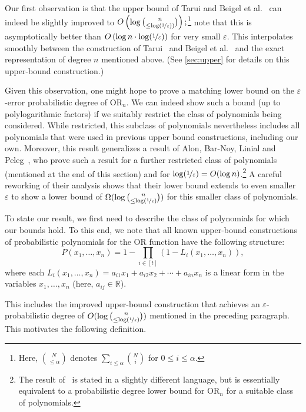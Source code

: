 \documentclass[10pt,a4paper]{article}
\theoremstyle{plain}
\theoremstyle{definition}
\renewcommand{\epsilon}{\varepsilon}
\newcommand{\eps}{\epsilon}
\newcommand{\OR}{\mathrm{OR}}
\newcommand{\reals}{\mathbb{R}}
\newcommand{\cbra}[1]{\left(#1\right)}
\newcommand{\bigo}[1]{O\left(#1\right)}
\newcommand{\lbmain}{\log \binom{n}{\leq \log\cbra{\nicefrac1{\eps}}}}
\newcommand{\lepsinv}{\log(\nicefrac1\eps)}
\begin{document}
Our first observation is that the upper bound of Tarui and Beigel et al.~\cite{BeigelRS1991} can indeed 
be slightly improved to $\bigo{\log \binom{n}{\leq \lepsinv)}};$\footnote{Here, $\binom{N}{\leq \alpha}$
denotes  $\sum_{i \leq \alpha} \binom{N}{i}$ for $0 \leq i \leq \alpha$.} note that this is asymptotically better than  
$\bigo{\log n \cdot \lepsinv}$ for very small $\eps.$ This interpolates smoothly between the construction of 
Tarui~\cite{Tarui1993} and Beigel et al.~\cite{BeigelRS1991} and the exact representation of degree $n$ mentioned above. 
(See \cref{sec:upper} for details on this upper-bound construction.) 

Given this observation, one might hope
to prove a matching lower bound on the $\eps$-error
probabilistic degree of $\OR_n$. We can indeed show such a bound (up to polylogarithmic factors) if we suitably
restrict the class of polynomials being considered. While restricted,
this subclass of polynomials nevertheless includes all polynomials
that were used in previous upper bound constructions, including our
own. Moreover, this result generalizes a result of Alon, Bar-Noy,
Linial and Peleg~\cite{AlonBLP1991}, who prove such a result for a
further restricted class of polynomials (mentioned at the end of this
section) and for $\lepsinv = O(\log n)$.\footnote{The result
  of~\cite{AlonBLP1991} is stated in a slightly different language,
  but is essentially equivalent to a probabilistic degree lower bound
  for $\OR_n$ for a suitable class of polynomials.}  A careful
reworking of their analysis shows that their lower bound extends to
even smaller $\epsilon$ to show a lower bound of $\Omega(\lbmain)$ for this smaller class of polynomials. 

To state our result, we first need to describe the class of
polynomials for which our bounds hold. To this end, we note that all
known upper-bound constructions of probabilistic polynomials for the
$\OR$ function have the following structure:
\[
P(x_1,\dots,x_n) = 1 - \prod_{i \in [t]} \left(1- L_i(x_1,\dots,x_n)\right),
\]
where each $L_i(x_1,\dots, x_n) = a_{i1} x_1 + a_{i2} x_2 + \cdots +
a_{in}x_n$ is a linear form in the variables $x_1,\ldots,x_n$ (here, $a_{ij}
\in \reals$). 

This includes the improved upper-bound construction
that achieves an $\eps$-probabilistic degree of $O(\log \binom{n}{\leq
  \lepsinv})$ mentioned in the preceding paragraph. This motivates
the following definition.
\end{document}
